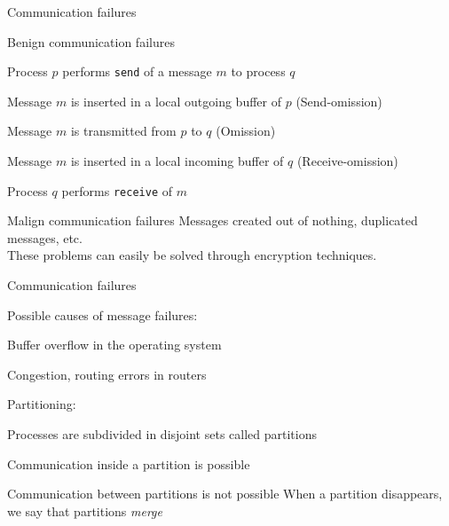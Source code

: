 \begin{frame}{Communication failures}

\begin{block}{Benign communication failures}
\BI
\item Process $p$ performs {\tt send} of a message $m$ to process $q$
\item Message $m$ is inserted in a local outgoing buffer of $p$ (\alert{Send-omission})
\item Message $m$ is transmitted from $p$ to $q$ (\alert{Omission})
\item Message $m$ is inserted in a local incoming buffer of $q$ (\alert{Receive-omission}) 
\item Process $q$ performs {\tt receive} of $m$
\EI
\end{block}

\begin{block}{Malign communication failures}
Messages created out of nothing, duplicated messages, etc. \\
These problems can easily be solved through encryption techniques.
\end{block}

\end{frame}

\begin{frame}{Communication failures}

Possible causes of message failures:
\BIL
  \item \alert{Buffer overflow} in the operating system
  \item \alert{Congestion}, routing errors in routers
  \item \alert{Partitioning}:
    \BI
    \item Processes are subdivided in disjoint sets called \alert{partitions}
    \item Communication inside a partition is possible
    \item Communication between partitions is not possible
    \EI
    When a partition disappears, we say that partitions {\em merge}
\EIL
\end{frame}



